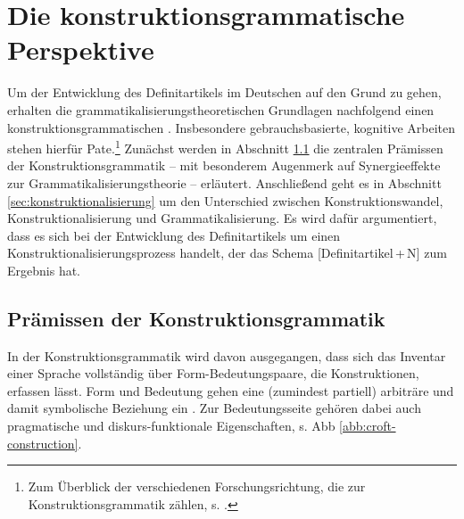 \section{Die konstruktionsgrammatische Perspektive}\label{sec:kxg}
Um der Entwicklung des Definitartikels im Deutschen auf den Grund zu gehen, erhalten die grammatikalisierungstheoretischen Grundlagen nachfolgend einen konstruktionsgrammatischen . Insbesondere gebrauchsbasierte, kognitive  Arbeiten \parencite[u.a.][]{Langacker1987,Goldberg1995,Goldberg2006,Croft2002,Croft2004,Bybee2006,Bybee2010} stehen hierfür Pate.\footnote{Zum Überblick der verschiedenen Forschungsrichtung, die zur Konstruktionsgrammatik zählen, s. \textcite{Croft2004,Imo2007,Stefanowitsch2011,Hoffmann2013,Ziem2013}.} Zunächst werden in Abschnitt \ref{sec:kxg-grundlagen} die zentralen Prämissen der Konstruktionsgrammatik -- mit besonderem Augenmerk auf Synergieeffekte zur Grammatikalisierungstheorie -- erläutert. Anschließend geht es in Abschnitt \ref{sec:konstruktionalisierung} um den Unterschied zwischen Konstruktionswandel,  Konstruktionalisierung und Grammatikalisierung. Es wird dafür argumentiert, dass es sich bei der Entwicklung des Definitartikels um einen Konstruktionalisierungsprozess handelt, der das Schema [Definitartikel\,+\,N] zum Ergebnis hat.  

\subsection{Prämissen der Konstruktionsgrammatik}\label{sec:kxg-grundlagen}


In der Konstruktionsgrammatik wird davon ausgegangen, dass sich das Inventar einer Sprache vollständig über Form-Bedeutungspaare, die Konstruktionen, erfassen lässt. Form und Bedeutung gehen eine (zumindest partiell) arbiträre und damit symbolische Beziehung ein \parencite[257]{Croft2004}. Zur Bedeutungsseite gehören dabei auch pragmatische und diskurs-funktionale Eigenschaften, s. Abb \ref{abb:croft-construction}.  

